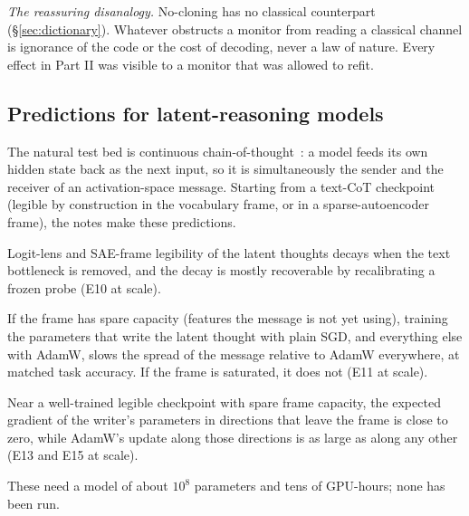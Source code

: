 \emph{The reassuring disanalogy.} No-cloning has no classical counterpart (\S\ref{sec:dictionary}). Whatever
obstructs a monitor from reading a classical channel is ignorance of the code or the cost of decoding, never a law of
nature. Every effect in Part II was visible to a monitor that was allowed to refit.

\subsection*{Predictions for latent-reasoning models}
The natural test bed is continuous chain-of-thought~\cite{Coconut}: a model feeds its own hidden state back as the
next input, so it is simultaneously the sender and the receiver of an activation-space message. Starting from a
text-CoT checkpoint (legible by construction in the vocabulary frame, or in a sparse-autoencoder frame), the notes
make these predictions.
\begin{prediction}
Logit-lens and SAE-frame legibility of the latent thoughts decays when the text bottleneck is removed, and the
decay is mostly recoverable by recalibrating a frozen probe (E10 at scale).
\end{prediction}
\begin{prediction}
If the frame has spare capacity (features the message is not yet using), training the parameters that write the
latent thought with plain SGD, and everything else with AdamW, slows the spread of the message relative to AdamW
everywhere, at matched task accuracy. If the frame is saturated, it does not (E11 at scale).
\end{prediction}
\begin{prediction}
Near a well-trained legible checkpoint with spare frame capacity, the expected gradient of the writer's parameters
in directions that leave the frame is close to zero, while AdamW's update along those directions is as large as
along any other (E13 and E15 at scale).
\end{prediction}
These need a model of about $10^8$ parameters and tens of GPU-hours; none has been run.

